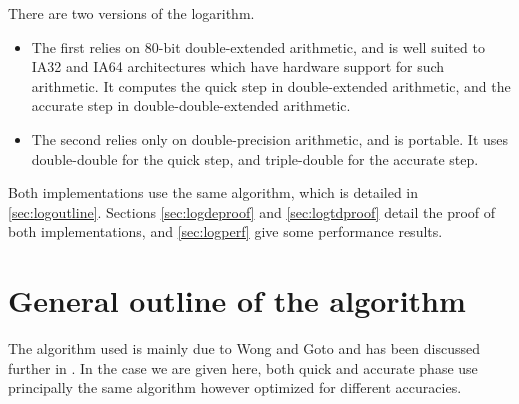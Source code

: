 %
%
%
%


There are two versions of the logarithm.
\begin{itemize}
\item The first relies on 80-bit double-extended arithmetic, and is
  well suited to IA32 and IA64 architectures which have hardware
  support for such arithmetic. It computes the quick step in
  double-extended arithmetic, and the accurate step in
  double-double-extended arithmetic.
\item The second relies only on double-precision arithmetic, and is
  portable. It uses double-double for the quick step, and
  triple-double for the accurate step.
\end{itemize}

Both implementations use the same algorithm, which is detailed in
\ref{sec:logoutline}. Sections \ref{sec:logdeproof} and
\ref{sec:logtdproof} detail the proof of both implementations, and
\ref{sec:logperf} give some performance results.


\section{General outline of the algorithm\label{sec:logoutline}}
The algorithm used is mainly due to 
Wong and Goto\cite{WG94} and has been discussed further in \cite{Muller97}. In the case we are given here,
both quick and accurate phase use principally the same algorithm however optimized for different accuracies.

